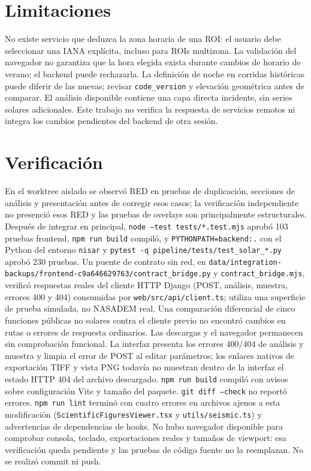 \documentclass[11pt]{article}
\begin{document}
\section{Limitaciones}
No existe servicio que deduzca la zona horaria de una ROI: el usuario debe seleccionar una IANA explícita, incluso para ROIs multizona. La validación del navegador no garantiza que la hora elegida exista durante cambios de horario de verano; el backend puede rechazarla. La definición de noche en corridas históricas puede diferir de las nuevas; revisar \texttt{code\_version} y elevación geométrica antes de comparar. El análisis disponible contiene una capa directa incidente, sin series solares adicionales. Este trabajo no verifica la respuesta de servicios remotos ni integra los cambios pendientes del backend de otra sesión.
\section{Verificación}
En el worktree aislado se observó RED en pruebas de duplicación, secciones de análisis y presentación antes de corregir esos casos; la verificación independiente no presenció esos RED y las pruebas de overlays son principalmente estructurales. Después de integrar en principal, \texttt{node --test tests/*.test.mjs} aprobó 103 pruebas frontend, \texttt{npm run build} compiló, y \texttt{PYTHONPATH=backend:.} con el Python del entorno \texttt{nisar} y \texttt{pytest -q pipeline/tests/test\_solar\_*.py} aprobó 230 pruebas. Un puente de contrato sin red, en \texttt{data/integration-backups/frontend-c9a646629763/contract\_bridge.py} y \texttt{contract\_bridge.mjs}, verificó respuestas reales del cliente HTTP Django (POST, análisis, muestra, errores 400 y 404) consumidas por \texttt{web/src/api/client.ts}; utiliza una superficie de prueba simulada, no NASADEM real. Una comparación diferencial de cinco funciones públicas no solares contra el cliente previo no encontró cambios en rutas o errores de respuesta ordinarios. Las descargas y el navegador permanecen sin comprobación funcional. La interfaz presenta los errores 400/404 de análisis y muestra y limpia el error de POST al editar parámetros; los enlaces nativos de exportación TIFF y vista PNG todavía no muestran dentro de la interfaz el estado HTTP 404 del archivo descargado. \texttt{npm run build} compiló con avisos sobre configuración Vite y tamaño del paquete. \texttt{git diff --check} no reportó errores. \texttt{npm run lint} terminó con cuatro errores en archivos ajenos a esta modificación (\texttt{ScientificFiguresViewer.tsx} y \texttt{utils/seismic.ts}) y advertencias de dependencias de hooks. No hubo navegador disponible para comprobar consola, teclado, exportaciones reales y tamaños de viewport: esa verificación queda pendiente y las pruebas de código fuente no la reemplazan. No se realizó commit ni push.
\end{document}
